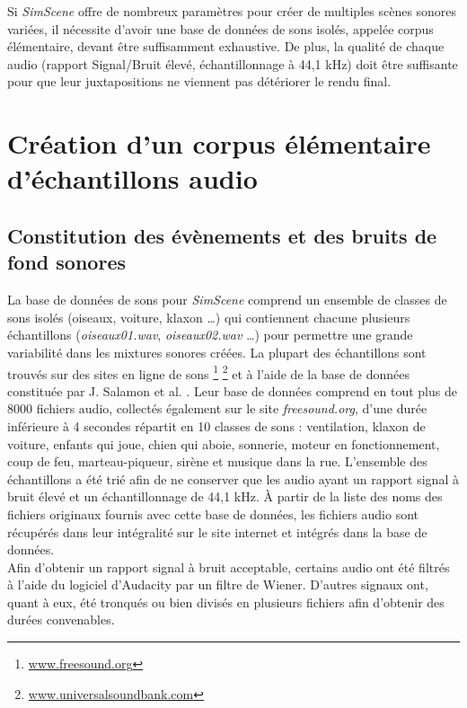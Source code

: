 Si \textit{SimScene} offre de nombreux paramètres pour créer de multiples scènes sonores variées, il nécessite d'avoir une base de données de sons isolés, appelée corpus élémentaire, devant être suffisamment exhaustive. De plus, la qualité de chaque audio (rapport Signal/Bruit élevé, échantillonnage à 44,1 kHz) doit être suffisante pour que leur juxtapositions ne viennent pas détériorer le rendu final. 

\section{Création d'un corpus élémentaire d'échantillons audio}

\subsection{Constitution des évènements et des bruits de fond sonores}

La base de données de sons pour \textit{SimScene} comprend un ensemble de classes de sons isolés (oiseaux, voiture, klaxon  \dots) qui contiennent chacune plusieurs échantillons (\textit{oiseaux01.wav}, \textit{oiseaux02.wav} \dots) pour permettre une grande variabilité dans les mixtures sonores créées. La plupart des échantillons sont trouvés sur des sites en ligne de sons \footnote{\url{www.freesound.org}} \footnote{\url{www.universalsoundbank.com}} et à l'aide de la base de données constituée par J. Salamon et al. \cite{salamon_dataset_nodate}. Leur base de données comprend en tout plus de 8000 fichiers audio, collectés également sur le site \textit{freesound.org}, d'une durée inférieure à 4 secondes répartit en 10 classes de sons : ventilation, klaxon de voiture, enfants qui joue, chien qui aboie, sonnerie, moteur en fonctionnement, coup de feu, marteau-piqueur, sirène et musique dans la rue. L'ensemble des échantillons a été trié afin de ne conserver que les audio ayant un rapport signal à bruit élevé et un échantillonnage de 44,1 kHz. \`A partir de la liste des noms des fichiers originaux fournis avec cette base de données, les fichiers audio sont récupérés dans leur intégralité sur le site internet et intégrés dans la base de données.\\
Afin d'obtenir un rapport signal à bruit acceptable, certains audio ont été filtrés à l'aide du logiciel d'Audacity par un filtre de Wiener. D'autres signaux ont, quant à eux, été tronqués ou bien divisés en plusieurs fichiers afin d'obtenir des durées convenables. 
 

